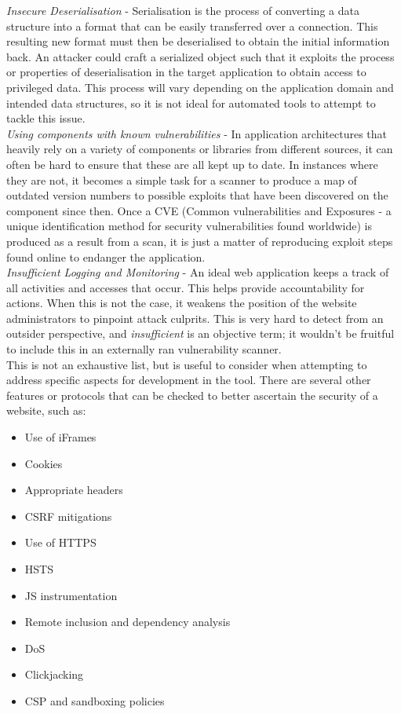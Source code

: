 	\emph{Insecure Deserialisation} - Serialisation is the process of converting a data structure into a format that can be easily transferred over a connection. This resulting new format must then be deserialised to obtain the initial information back. An attacker could craft a serialized object such that it exploits the process or properties of deserialisation in the target application to obtain access to privileged data. This process will vary depending on the application domain and intended data structures, so it is not ideal for automated tools to attempt to tackle this issue. \\ 
	
	\emph{Using components with known vulnerabilities} - In application architectures that heavily rely on a variety of components or libraries from different sources, it can often be hard to ensure that these are all kept up to date. In instances where they are not, it becomes a simple task for a scanner to produce a map of outdated version numbers to possible exploits that have been discovered on the component since then. Once a CVE (Common vulnerabilities and Exposures - a unique identification method for security vulnerabilities found worldwide) is produced as a result from a scan, it is just a matter of reproducing exploit steps found online to endanger the application. \\ 
	
	\emph{Insufficient Logging and Monitoring} - An ideal web application keeps a track of all activities and accesses that occur. This helps provide accountability for actions. When this is not the case, it weakens the position of the website administrators to pinpoint attack culprits. This is very hard to detect from an outsider perspective, and \textit{insufficient} is an objective term; it wouldn't be fruitful to include this in an externally ran vulnerability scanner. \\

	This is not an exhaustive list, but is useful to consider when attempting to address specific aspects for development in the tool. There are several other features or protocols that can be checked to better ascertain the security of a website, such as:
\begin{multicols}{3}
	\begin{itemize}
	\item   Use of iFrames
	\item 	Cookies
	\item 	Appropriate headers
	\item 	CSRF mitigations
	\item 	Use of HTTPS
	\item   HSTS
	\item 	JS instrumentation
	\item 	Remote inclusion and dependency analysis
	\item 	DoS
	\item 	Clickjacking
	\item 	CSP and sandboxing policies
	\end{itemize}
\end{multicols}



